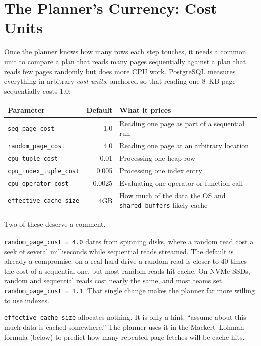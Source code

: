 \section{The Planner's Currency: Cost Units}
\label{ch07:cost-units}

Once the planner knows how many rows each step touches, it needs a common unit to compare a plan that reads many pages sequentially against a plan that reads few pages randomly but does more CPU work. PostgreSQL measures everything in arbitrary \emph{cost units}, anchored so that reading one 8~KB page sequentially costs $1.0$:

\begin{center}
\small
\begin{tabular}{@{}lrl@{}}
\toprule
\textbf{Parameter} & \textbf{Default} & \textbf{What it prices} \\
\midrule
\texttt{seq\_page\_cost} & 1.0 & Reading one page as part of a sequential run \\
\texttt{random\_page\_cost} & 4.0 & Reading one page at an arbitrary location \\
\texttt{cpu\_tuple\_cost} & 0.01 & Processing one heap row \\
\texttt{cpu\_index\_tuple\_cost} & 0.005 & Processing one index entry \\
\texttt{cpu\_operator\_cost} & 0.0025 & Evaluating one operator or function call \\
\texttt{effective\_cache\_size} & 4GB & How much of the data the OS and \texttt{shared\_buffers} likely cache \\
\bottomrule
\end{tabular}
\end{center}

Two of these deserve a comment.

\texttt{random\_page\_cost = 4.0} dates from spinning disks, where a random read cost a seek of several milliseconds while sequential reads streamed. The default is already a compromise: on a real hard drive a random read is closer to 40 times the cost of a sequential one, but most random reads hit cache. On NVMe SSDs, random and sequential reads cost nearly the same, and most teams set \texttt{random\_page\_cost = 1.1}. That single change makes the planner far more willing to use indexes.

\texttt{effective\_cache\_size} allocates nothing. It is only a hint: ``assume about this much data is cached somewhere.'' The planner uses it in the Mackert--Lohman formula (below) to predict how many repeated page fetches will be cache hits.

